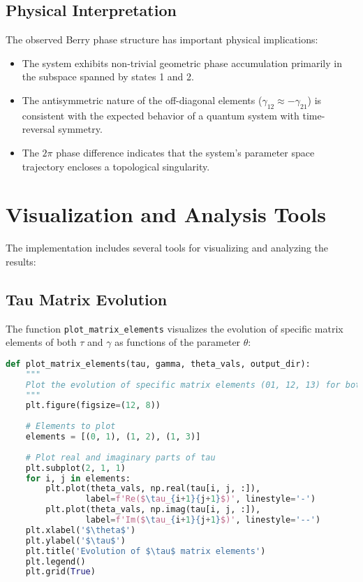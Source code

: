 \documentclass{article}
\begin{document}
\subsection{Physical Interpretation}

The observed Berry phase structure has important physical implications:

\begin{itemize}
    \item The system exhibits non-trivial geometric phase accumulation primarily in the subspace spanned by states 1 and 2.
    
    \item The antisymmetric nature of the off-diagonal elements ($\gamma_{12} \approx -\gamma_{21}$) is consistent with the expected behavior of a quantum system with time-reversal symmetry.
    
    \item The $2\pi$ phase difference indicates that the system's parameter space trajectory encloses a topological singularity.
\end{itemize}

\section{Visualization and Analysis Tools}

The implementation includes several tools for visualizing and analyzing the results:

\subsection{Tau Matrix Evolution}

The function \texttt{plot\_matrix\_elements} visualizes the evolution of specific matrix elements of both $\tau$ and $\gamma$ as functions of the parameter $\theta$:

\begin{lstlisting}[language=Python, caption=Plotting tau matrix elements]
def plot_matrix_elements(tau, gamma, theta_vals, output_dir):
    """
    Plot the evolution of specific matrix elements (01, 12, 13) for both tau and gamma matrices.
    """
    plt.figure(figsize=(12, 8))
    
    # Elements to plot
    elements = [(0, 1), (1, 2), (1, 3)]
    
    # Plot real and imaginary parts of tau
    plt.subplot(2, 1, 1)
    for i, j in elements:
        plt.plot(theta_vals, np.real(tau[i, j, :]), 
                label=f'Re($\tau_{i+1}{j+1}$)', linestyle='-')
        plt.plot(theta_vals, np.imag(tau[i, j, :]), 
                label=f'Im($\tau_{i+1}{j+1}$)', linestyle='--')
    plt.xlabel('$\theta$')
    plt.ylabel('$\tau$')
    plt.title('Evolution of $\tau$ matrix elements')
    plt.legend()
    plt.grid(True)
\end{lstlisting}
\end{document}

